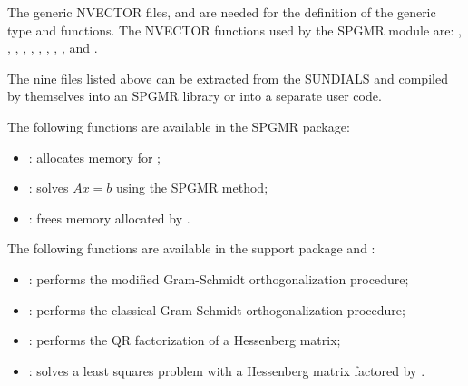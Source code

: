 \documentclass[letterpaper,10pt,english]{sphinxmanual}
\begin{document}
The generic NVECTOR files,  and
 are needed for the definition of the generic
 type and functions.  The NVECTOR functions used by the
SPGMR module are: {\hyperref[nvectors/index:c.N_VDotProd]{\emph{}}}, {\hyperref[nvectors/index:c.N_VLinearSum]{\emph{}}},
{\hyperref[nvectors/index:c.N_VScale]{\emph{}}}, {\hyperref[nvectors/index:c.N_VProd]{\emph{}}}, {\hyperref[nvectors/index:c.N_VDiv]{\emph{}}},
{\hyperref[nvectors/index:c.N_VConst]{\emph{}}}, {\hyperref[nvectors/index:c.N_VClone]{\emph{}}},
, {\hyperref[nvectors/index:c.N_VDestroy]{\emph{}}}, and
.

The nine files listed above can be extracted from the SUNDIALS
 and compiled by themselves into an SPGMR library or into a
separate user code.

The following functions are available in the SPGMR package:
\begin{itemize}
\item {} 
: allocates memory for ;

\item {} 
: solves \(Ax = b\) using the SPGMR method;

\item {} 
: frees memory allocated by .

\end{itemize}

The following functions are available in the support package
 and :
\begin{itemize}
\item {} 
: performs the modified Gram-Schmidt orthogonalization
procedure;

\item {} 
: performs the classical Gram-Schmidt
orthogonalization procedure;

\item {} 
: performs the QR factorization of a Hessenberg matrix;

\item {} 
: solves a least squares problem with a Hessenberg matrix
factored by .

\end{itemize}
\end{document}
